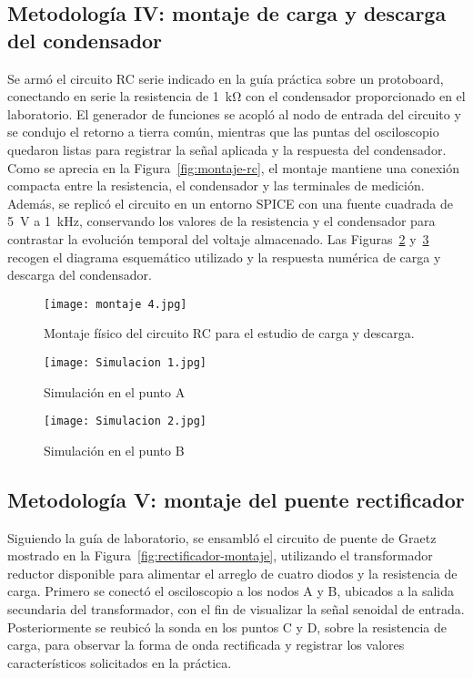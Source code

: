 \documentclass[conference]{IEEEtran} %
\begin{document}
\subsection{Metodología IV: montaje de carga y descarga del condensador}
Se armó el circuito RC serie indicado en la guía práctica sobre un protoboard, conectando en serie la resistencia de \SI{1}{\kilo\ohm} con el condensador proporcionado en el laboratorio. El generador de funciones se acopló al nodo de entrada del circuito y se condujo el retorno a tierra común, mientras que las puntas del osciloscopio quedaron listas para registrar la señal aplicada y la respuesta del condensador. Como se aprecia en la Figura~\ref{fig:montaje-rc}, el montaje mantiene una conexión compacta entre la resistencia, el condensador y las terminales de medición. Además, se replicó el circuito en un entorno SPICE con una fuente cuadrada de \SI{5}{\volt} a \SI{1}{\kilo\hertz}, conservando los valores de la resistencia y el condensador para contrastar la evolución temporal del voltaje almacenado. Las Figuras~\ref{fig:simulacion-rc-esquematico} y~\ref{fig:simulacion-rc-respuesta} recogen el diagrama esquemático utilizado y la respuesta numérica de carga y descarga del condensador.
\begin{figure}[htbp]
    \centering
\texttt{[image: montaje 4.jpg]}
    \caption{Montaje físico del circuito RC para el estudio de carga y descarga.}
    \label{fig:montaje 4}
\end{figure}
\begin{figure}[htbp]
    \centering
\texttt{[image: Simulacion 1.jpg]}
    \caption{Simulación en el punto A}
    \label{fig:simulacion-rc-esquematico}
\end{figure}
\begin{figure}[htbp]
    \centering
\texttt{[image: Simulacion 2.jpg]}
    \caption{Simulación en el punto B}
    \label{fig:simulacion-rc-respuesta}
\end{figure}

\subsection{Metodología V: montaje del puente rectificador}
Siguiendo la guía de laboratorio, se ensambló el circuito de puente de Graetz mostrado en la Figura~\ref{fig:rectificador-montaje}, utilizando el transformador reductor disponible para alimentar el arreglo de cuatro diodos y la resistencia de carga. Primero se conectó el osciloscopio a los nodos A y B, ubicados a la salida secundaria del transformador, con el fin de visualizar la señal senoidal de entrada. Posteriormente se reubicó la sonda en los puntos C y D, sobre la resistencia de carga, para observar la forma de onda rectificada y registrar los valores característicos solicitados en la práctica.
\end{document}
